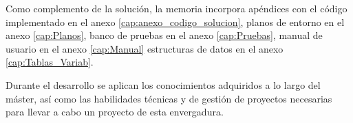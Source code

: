 Como complemento de la solución, la memoria incorpora apéndices con el código implementado en el anexo \ref{cap:anexo_codigo_solucion}, planos de entorno en el anexo \ref{cap:Planos}, banco de pruebas en el anexo \ref{cap:Pruebas}, manual de usuario en el anexo \ref{cap:Manual} estructuras de datos en el anexo \ref{cap:Tablas_Variab}.\par

Durante el desarrollo  se aplican los conocimientos adquiridos a lo largo del máster, así como las habilidades técnicas y de gestión de proyectos necesarias para llevar a cabo un proyecto de esta envergadura.\par